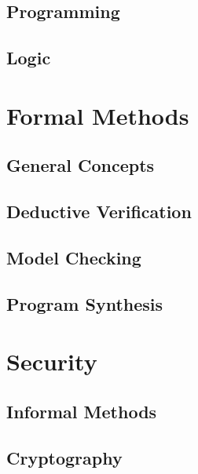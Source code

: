 \documentclass{book}
\begin{document}
  \chapter{Programming}\label{sec:sd:program}
  

  \chapter{Logic}\label{sec:sd:logic}
  
  
\part{Formal Methods}\label{sec:sd:fm}

  \chapter{General Concepts}\label{sec:sd:fmoverview}
    

  \chapter{Deductive Verification}\label{sec:sd:deductive}
    

  \chapter{Model Checking}\label{sec:sd:modelcheck}
    

  \chapter{Program Synthesis}\label{sec:sd:synthesis}
    

\part{Security}\label{sec:sd:security}

  \chapter{Informal Methods}\label{sec:sd:informalsecurity}
    

  \chapter{Cryptography}\label{sec:sd:crypto}
    
\end{document}

